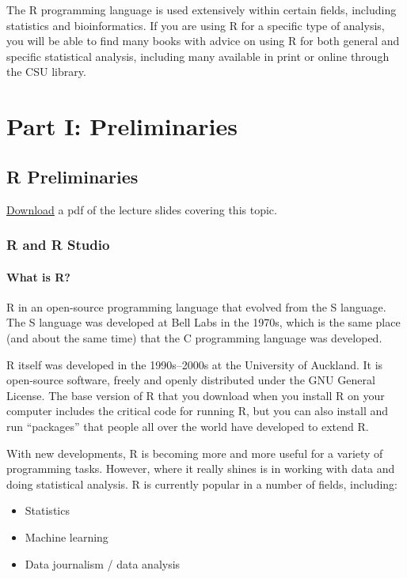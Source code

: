 \documentclass[]{book}
\providecommand{\tightlist}{%
  \setlength{\itemsep}{0pt}\setlength{\parskip}{0pt}}
\theoremstyle{definition}
\theoremstyle{definition}
\theoremstyle{definition}
\theoremstyle{remark}
\begin{document}
The R programming language is used extensively within certain fields,
including statistics and bioinformatics. If you are using R for a
specific type of analysis, you will be able to find many books with
advice on using R for both general and specific statistical analysis,
including many available in print or online through the CSU library.

\part{Part I: Preliminaries}\label{part-part-i-preliminaries}

\chapter{R Preliminaries}\label{r-preliminaries}

\href{https://github.com/geanders/RProgrammingForResearch/raw/master/slides/CourseNotes_Week1.pdf}{Download}
a pdf of the lecture slides covering this topic.

\section{R and R Studio}\label{r-and-r-studio}

\subsection{What is R?}\label{what-is-r}

R in an open-source programming language that evolved from the S
language. The S language was developed at Bell Labs in the 1970s, which
is the same place (and about the same time) that the C programming
language was developed.

R itself was developed in the 1990s--2000s at the University of
Auckland. It is open-source software, freely and openly distributed
under the GNU General License. The base version of R that you download
when you install R on your computer includes the critical code for
running R, but you can also install and run ``packages'' that people all
over the world have developed to extend R.

With new developments, R is becoming more and more useful for a variety
of programming tasks. However, where it really shines is in working with
data and doing statistical analysis. R is currently popular in a number
of fields, including:

\begin{itemize}
\tightlist
\item
  Statistics
\item
  Machine learning
\item
  Data journalism / data analysis
\end{itemize}
\end{document}
